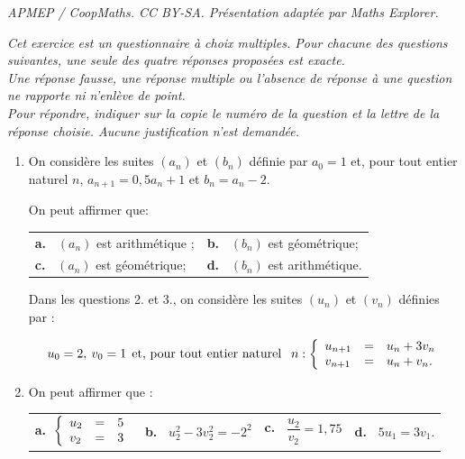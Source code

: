 \documentclass[10pt]{article}
\begin{document}
\noindent\textit{APMEP / CoopMaths. CC BY-SA. Présentation adaptée par Maths Explorer.}\par\medskip
\medskip

\emph{Cet exercice est un questionnaire à choix multiples. Pour chacune des questions suivantes, une seule des quatre réponses proposées est exacte.\\
Une réponse fausse, une réponse multiple ou l'absence de réponse à une question ne rapporte ni n'enlève de point.\\
Pour répondre, indiquer sur la copie le numéro de la question et la lettre de la réponse choisie. Aucune justification n'est demandée.}

\medskip

\begin{enumerate}
\item On considère les suites $\left(a_n\right)$ et $\left(b_n\right)$ définie par $a_0 = 1$ et, pour tout entier naturel $n$,\: $a_{n+1} = 0,5a_n + 1$ et $b_n = a_n - 2$.

On peut affirmer que:

\begin{center}
\begin{tabularx}{\linewidth}{*{2}{X}}
\textbf{a.~} $\left(a_n\right)$ est arithmétique ;&\textbf{b.~} $\left(b_n\right)$ est géométrique;\\
\textbf{c.~} $\left(a_n\right)$ est géométrique;&\textbf{d.~} $\left(b_n\right)$ est arithmétique.
\end{tabularx}
\end{center}

Dans les questions 2. et 3., on considère les suites $\left(u_n\right)$ et $\left(v_n\right)$ définies par :

\[u_0 = 2,\: v_0 = 1 \:\: \text{et, pour tout entier naturel }\:\:n : \left\{\begin{array}{l c l}
u_{n+1}&=&u_n + 3v_n\\
v_{n+1}&=&u_n + v_n.
\end{array}\right.\]

\item On peut affirmer que :

\begin{center}
\begin{tabularx}{\linewidth}{*{4}{X}}
\textbf{a.~}$\left\{\begin{array}{l c l}
u_2& =& 5\\ v_2 &=& 3
\end{array}\right.$&\textbf{b.~} $u_2^2 - 3v_2^2 = - 2^2$&\textbf{c.~} $\dfrac{u_2}{v_2} = 1,75$&\textbf{d.~} $5u_1 = 3v_1$.\\
\end{tabularx}
\end{center}


\end{enumerate}
\end{document}
